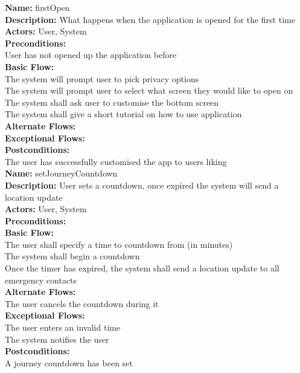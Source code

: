 \documentclass[a4paper]{report}
\begin{document}
\textbf{Name:} firstOpen \\
\textbf{Description:} What happens when the application is opened for the first time \\
\textbf{Actors:} User, System\\
\textbf{Preconditions:}\\
User has not opened up the application before \\
\textbf{Basic Flow:} \\
The system will prompt user to pick privacy options \\
The system will prompt user to select what screen they would like to open on \\
The system shall ask user to customise the bottom screen \\
The system shall give a short tutorial on how to use application\\
\textbf{Alternate Flows:} \\
\textbf{Exceptional Flows:}\\
\textbf{Postconditions:}\\
The user has successfully customised the app to users liking \\


\textbf{Name:} setJourneyCountdown \\
\textbf{Description:} User sets a countdown, once expired the system will send a location update\\
\textbf{Actors:} User, System\\
\textbf{Preconditions:} \\
\textbf{Basic Flow:}\\
The user shall specify a time to countdown from (in minutes)\\ 
The system shall begin a countdown \\
Once the timer has expired, the system shall send a location update to all emergency contacts \\
\textbf{Alternate Flows:}\\
The user cancels the countdown during it \\
\textbf{Exceptional Flows:}\\
The user enters an invalid time \\
The system notifies the user\\
\textbf{Postconditions:}\\
A journey countdown has been set \\
\end{document}
